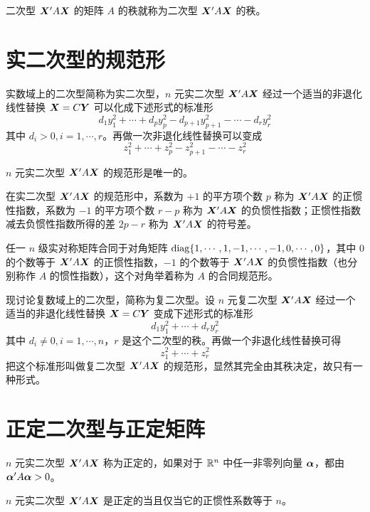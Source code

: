二次型 $\boldsymbol{X}'A\boldsymbol{X}$ 的矩阵 $A$ 的秩就称为二次型 $\boldsymbol{X}'A\boldsymbol{X}$ 的秩。

\section{实二次型的规范形}

实数域上的二次型简称为实二次型，$n$ 元实二次型 $\boldsymbol{X}'A\boldsymbol{X}$ 经过一个适当的非退化线性替换 $\boldsymbol{X} = C\boldsymbol{Y}$ 可以化成下述形式的标准形
$$d_1y_1^2+\cdots+d_py_p^2-d_{p+1}y_{p+1}^2-\cdots-d_ry_r^2$$
其中 $d_i>0,i=1,\cdots,r$。再做一次非退化线性替换可以变成
$$z_1^2+\cdots+z_p^2-z_{p+1}^2-\cdots-z_r^2$$

\begin{theorem}
    $n$ 元实二次型 $\boldsymbol{X}'A\boldsymbol{X}$ 的规范形是唯一的。
\end{theorem}

\begin{definition}
    在实二次型 $\boldsymbol{X}'A\boldsymbol{X}$ 的规范形中，系数为 $+1$ 的平方项个数 $p$ 称为 $\boldsymbol{X}'A\boldsymbol{X}$ 的正惯性指数，系数为 $-1$ 的平方项个数 $r-p$ 称为 $\boldsymbol{X}'A\boldsymbol{X}$ 的负惯性指数；正惯性指数减去负惯性指数所得的差 $2p-r$ 称为 $\boldsymbol{X}'A\boldsymbol{X}$ 的符号差。
\end{definition}

任一 $n$ 级实对称矩阵合同于对角矩阵 $\operatorname{diag}\{1,\cdots,1,-1,\cdots,-1,0,\cdots,0\}$，其中 $0$ 的个数等于 $\boldsymbol{X}'A\boldsymbol{X}$ 的正惯性指数，$-1$ 的个数等于 $\boldsymbol{X}'A\boldsymbol{X}$ 的负惯性指数（也分别称作 $A$ 的惯性指数），这个对角举着称为 $A$ 的合同规范形。

现讨论复数域上的二次型，简称为复二次型。设 $n$ 元复二次型 $\boldsymbol{X}'A\boldsymbol{X}$ 经过一个适当的非退化线性替换 $\boldsymbol{X} = C\boldsymbol{Y}$ 变成下述形式的标准形
$$d_1y_1^2+\cdots+d_ry_r^2$$
其中 $d_i\ne 0,i=1,\cdots,n$，$r$ 是这个二次型的秩。再做一个非退化线性替换可得
$$z_1^2+\cdots+z_r^2$$
把这个标准形叫做复二次型 $\boldsymbol{X}'A\boldsymbol{X}$ 的规范形，显然其完全由其秩决定，故只有一种形式。

\section{正定二次型与正定矩阵}

\begin{definition}
    $n$ 元实二次型 $\boldsymbol{X}'A\boldsymbol{X}$ 称为正定的，如果对于 $\mathbb{R}^n$ 中任一非零列向量 $\boldsymbol{\alpha}$，都由 $\boldsymbol{\alpha}'A\boldsymbol{\alpha}>0$。
\end{definition}

\begin{theorem}
    $n$ 元实二次型 $\boldsymbol{X}'A\boldsymbol{X}$ 是正定的当且仅当它的正惯性系数等于 $n$。
\end{theorem}

